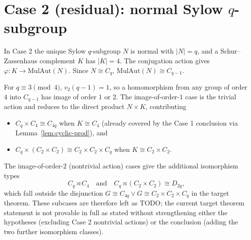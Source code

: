 \section{Case 2 (residual): normal Sylow $q$-subgroup}

In Case 2 the unique Sylow $q$-subgroup $N$ is normal with $|N| = q$, and a
Schur--Zassenhaus complement $K$ has $|K| = 4$. The conjugation action gives
$\varphi : K \to \mathrm{MulAut}(N)$. Since $N \cong C_q$,
$\mathrm{MulAut}(N) \cong C_{q-1}$.

For $q \equiv 3 \pmod 4$, $v_2(q-1) = 1$, so a homomorphism from any group of
order $4$ into $C_{q-1}$ has image of order $1$ or $2$. The image-of-order-$1$
case is the trivial action and reduces to the direct product
$N \times K$, contributing
\begin{itemize}
    \item $C_q \times C_4 \cong C_{4q}$ when $K \cong C_4$ (already covered by
        the Case 1 conclusion via Lemma~\ref{lem:cyclic-prod}), and
    \item $C_q \times (C_2 \times C_2) \cong C_2 \times C_2 \times C_q$ when
        $K \cong C_2 \times C_2$.
\end{itemize}

The image-of-order-$2$ (nontrivial action) cases give the additional
isomorphism types
\[
    C_q \rtimes C_4 \quad \text{and} \quad C_q \rtimes (C_2 \times C_2) \cong D_{2q},
\]
which fall outside the disjunction $G \cong C_{4q} \lor G \cong C_2 \times
C_2 \times C_q$ in the target theorem. These subcases are therefore left as
TODO; the current target theorem statement is not provable in full as stated
without strengthening either the hypotheses (excluding Case 2 nontrivial
actions) or the conclusion (adding the two further isomorphism classes).


